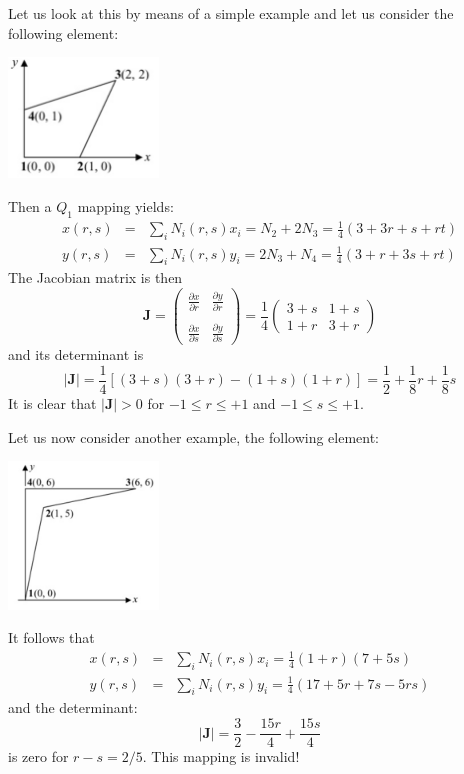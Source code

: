 Let us look at this by means of a simple example and let us consider the following 
element:
\begin{center}
\includegraphics[width=4cm]{images/mappings/fournode/ex1}
\end{center}
Then a $Q_1$ mapping yields:
\begin{eqnarray}
x(r,s) &=& \sum_i N_i(r,s) x_i = N_2 + 2N_3 = \frac{1}{4} (3+3r+ s+rt) \\
y(r,s) &=& \sum_i N_i(r,s) y_i = 2N_3 + N_4 = \frac{1}{4} (3+r+ 3s+rt) 
\end{eqnarray}
The Jacobian matrix is then
\begin{equation}
{\bm J} = 
\left(
\begin{array}{cc}
\frac{\partial x}{\partial r} & \frac{\partial y}{\partial r} \nonumber\\ \\
\frac{\partial x}{\partial s} & \frac{\partial y}{\partial s} \nonumber
\end{array}
\right)
=
\frac{1}{4}
\left(
\begin{array}{cc}
3+s & 1+s \\
1+r & 3+r
\end{array}
\right)
\end{equation}
and its determinant is 
\begin{equation}
|{\bm J}|=\frac{1}{4} [(3+s)(3+r)-(1+s)(1+r)]=\frac{1}{2}+\frac{1}{8}r+\frac{1}{8}s
\end{equation}
It is clear that $|{\bm J}|>0$ for $-1\leq r \leq +1$ and $-1\leq s \leq +1$. 

Let us now consider another example, the following element:
\begin{center}
\includegraphics[width=4cm]{images/mappings/fournode/ex2}
\end{center}
It follows that
\begin{eqnarray}
x(r,s) &=& \sum_i N_i(r,s) x_i = \frac{1}{4}(1+r)(7+5s) \\ 
y(r,s) &=& \sum_i N_i(r,s) y_i = \frac{1}{4}(17+5r+7s-5rs)
\end{eqnarray}
and the determinant:
\[
|{\bm J}|=\frac{3}{2}-\frac{15r}{4}+\frac{15s}{4}
\]
is zero for $r-s=2/5$. This mapping is invalid!

